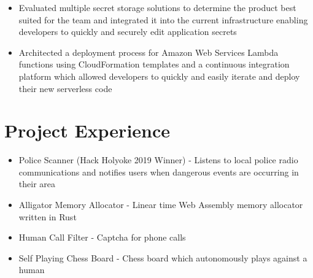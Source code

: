 \documentclass[10pt]{article}
\begin{document}
\begin{flushleft}
\begin{itemize}
		\item Evaluated multiple secret storage solutions to determine the product best suited for the team and
			integrated it into the current infrastructure enabling developers to quickly and securely edit 
			application secrets

		\item Architected a deployment process for Amazon Web Services Lambda functions using CloudFormation templates
			and a continuous integration platform which allowed developers to quickly and easily iterate and deploy 
			their new serverless code
	\end{itemize}




\section{Project Experience}
    \begin{itemize}
        \item Police Scanner (Hack Holyoke 2019 Winner) - Listens to local police radio communications and notifies users when dangerous events are occurring in their area

        \item Alligator Memory Allocator - Linear time Web Assembly memory allocator written in Rust
    
		\item Human Call Filter - Captcha for phone calls

		\item Self Playing Chess Board - Chess board which autonomously plays against a human


\end{itemize}
\end{flushleft}
\end{document}
